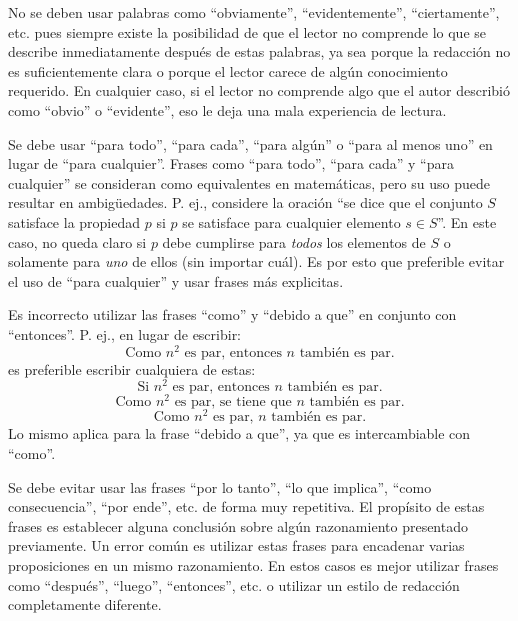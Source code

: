 No se deben usar palabras como ``obviamente'', ``evidentemente'', ``ciertamente'', etc. pues siempre existe la posibilidad de que el lector no comprende lo que se describe inmediatamente después de estas palabras, ya sea porque la redacción no es suficientemente clara o porque el lector carece de algún conocimiento requerido.
En cualquier caso, si el lector no comprende algo que el autor describió como ``obvio'' o ``evidente'', eso le deja una mala experiencia de lectura.

Se debe usar ``para todo'', ``para cada'', ``para algún'' o ``para al menos uno'' en lugar de ``para cualquier''.
Frases como ``para todo'', ``para cada'' y ``para cualquier'' se consideran como equivalentes en matemáticas, pero su uso puede resultar en ambigüedades.
P. ej., considere la oración ``se dice que el conjunto \(S\) satisface la propiedad \(p\) si \(p\) se satisface para cualquier elemento \(s\in S\)''.
En este caso, no queda claro si \(p\) debe cumplirse para \emph{todos} los elementos de \(S\) o solamente para \emph{uno} de ellos (sin importar cuál).
Es por esto que preferible evitar el uso de ``para cualquier'' y usar frases más explicitas.

Es incorrecto utilizar las frases ``como'' y ``debido a que'' en conjunto con ``entonces''.
P. ej., en lugar de escribir:
\[
  \text{Como }n^{2}\text{ es par, entonces }n\text{ también es par.}
\]
es preferible escribir cualquiera de estas:
\[
  \text{Si }n^{2}\text{ es par, entonces }n\text{ también es par.}
\]
\[
  \text{Como }n^{2}\text{ es par, se tiene que }n\text{ también es par.}
\]
\[
  \text{Como }n^{2}\text{ es par, }n\text{ también es par.}
\]
Lo mismo aplica para la frase ``debido a que'', ya que es intercambiable con ``como''.

Se debe evitar usar las frases ``por lo tanto'', ``lo que implica'', ``como consecuencia'', ``por ende'', etc. de forma muy repetitiva.
El propísito de estas frases es establecer alguna conclusión sobre algún razonamiento presentado previamente.
Un error común es utilizar estas frases para encadenar varias proposiciones en un mismo razonamiento.
En estos casos es mejor utilizar frases como ``después'', ``luego'', ``entonces'', etc. o utilizar un estilo de redacción completamente diferente.


